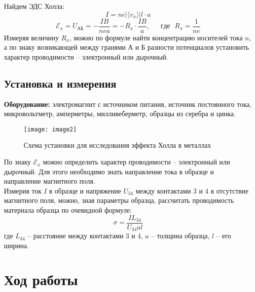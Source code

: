 \documentclass{lab}
\begin{document}
Найдем ЭДС Холла:
$$ I = ne| \langle v_x \rangle |l\cdot a $$
$$ \mathscr{E}_x = U_{АБ} = - \dfrac{IB}{nea} = -R_x \cdot \dfrac{IB}{a}, ~~~~~~~ где ~~~ R_x = \dfrac{1}{ne} $$
Измеряя величину $ R_x $, можно по формуле найти концентрацию носителей тока $ n $, а по
знаку возникающей между гранями А и Б разности потенциалов установить характер проводимости
-- электронный или дырочный.

\newpage

\subsection*{Установка и измерения}

\textbf{Оборудование: } электромагнит с источником питания, источник постоянного тока, микровольтметр, амперметры, милливеберметр, образцы из серебра и цинка.

\begin{figure}[H]
	\centering
	\texttt{[image: image2]}
	\caption{\footnotesize Схема установки для исследования эффекта Холла в металлах}
\end{figure}

По знаку $ \mathscr{E}_x $ можно определить характер проводимости -- электронный или дырочный. Для этого необходимо знать направление тока в образце и направление магнитного поля.\\
Измерив ток $ I $ в образце и напряжение $ U_{34} $ между контактами 3 и 4 в отсутствие
магнитного поля, можно, зная параметры образца, рассчитать проводимость материала образца по очевидной формуле:
\begin{equation}
\sigma = \dfrac{IL_{34}}{U_{34}al}
\end{equation}
где $ L_{34} $ -- расстояние между контактами 3 и 4, $ a $ -- толщина образца, $ l $ -- его ширина.

\newpage

\section*{Ход работы}
\end{document}
